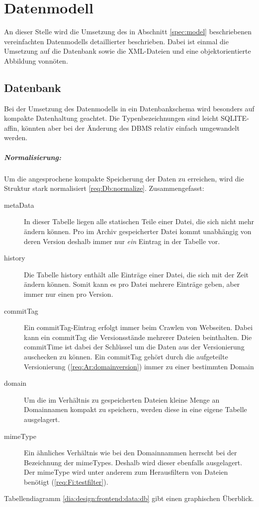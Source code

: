 \chapter{Datenmodell}
\liable{\cii}
An dieser Stelle wird die Umsetzung des in Abschnitt \ref{spec:model} 
beschriebenen vereinfachten Datenmodells detaillierter beschrieben. 
Dabei ist einmal die Umsetzung auf die Datenbank sowie die XML-Dateien und eine objektorientierte
Abbildung vonnöten.

\section{Datenbank}
Bei der Umsetzung des Datenmodells in ein Datenbankschema wird besonders auf kompakte Datenhaltung geachtet. 
Die Typenbezeichnungen sind leicht SQLITE-affin, könnten aber bei der Änderung des DBMS relativ einfach umgewandelt werden.
\paragraph{Normalisierung:} Um die angesprochene kompakte Speicherung der Daten zu erreichen,
wird die Struktur stark normalisiert \ref{req:Db:normalize}. Zusammengefasst:
\begin{description}
	\item [metaData]
		In dieser Tabelle liegen alle statischen Teile einer Datei, die sich nicht mehr
		ändern können. 
		Pro im Archiv gespeicherter Datei kommt unabhängig von deren Version deshalb 
		immer nur \emph{ein} Eintrag in der Tabelle vor.
	\item [history]
		Die Tabelle history enthält alle Einträge einer Datei, die sich mit der Zeit ändern
		können. Somit kann es pro Datei mehrere Einträge geben, aber immer nur einen pro Version.
	\item [commitTag]
		Ein commitTag-Eintrag erfolgt immer beim Crawlen von Webseiten. Dabei kann ein
		commitTag die Versionsstände mehrerer Dateien beinthalten.
		Die commitTime ist dabei der Schlüssel um die Daten aus der Versionierung
		auschecken zu können.
		Ein commitTag gehört durch die aufgeteilte Versionierung (\ref{req:Ar:domainversion}) immer zu einer bestimmten Domain
	\item [domain]
		Um die im Verhältnis zu gespeicherten Dateien kleine Menge an Domainnamen kompakt zu speichern,
		werden diese in eine eigene Tabelle ausgelagert.
	\item [mimeType]
		Ein ähnliches Verhältnis wie bei den Domainnammen herrscht bei der Bezeichnung der mimeTypes.
		Deshalb wird dieser ebenfalls ausgelagert.
		Der mimeType wird unter anderem zum Herausfiltern von Dateien benötigt (\ref{req:Fi:testfilter}).
\end{description}
Tabellendiagramm \ref{dia:design:frontend:data:db} gibt einen graphischen Überblick.
